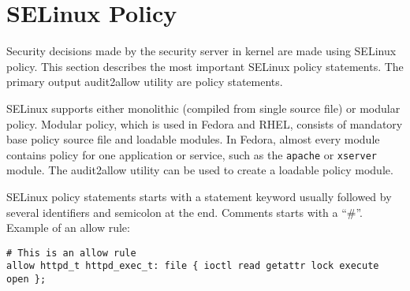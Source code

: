 \section{SELinux Policy}
\label{policy}
Security decisions made by the security server in kernel are made using
SELinux policy. This section describes the most important SELinux policy
statements. The primary output audit2allow utility are policy statements.

SELinux supports either monolithic (compiled from single source file) or modular
policy. Modular policy, which is used in Fedora and RHEL, consists of mandatory
base policy source file and loadable modules. In Fedora, almost every module
contains policy for one application or service, such as the \texttt{apache} or
\texttt{xserver} module. The audit2allow utility can be used to create a
loadable policy module.

SELinux policy statements starts with a statement keyword usually followed by
several identifiers and semicolon at the end. Comments starts with a ``\#''.
Example of an allow rule:

\begin{lstlisting}[language=te]
# This is an allow rule
allow httpd_t httpd_exec_t: file { ioctl read getattr lock execute open };
\end{lstlisting}

